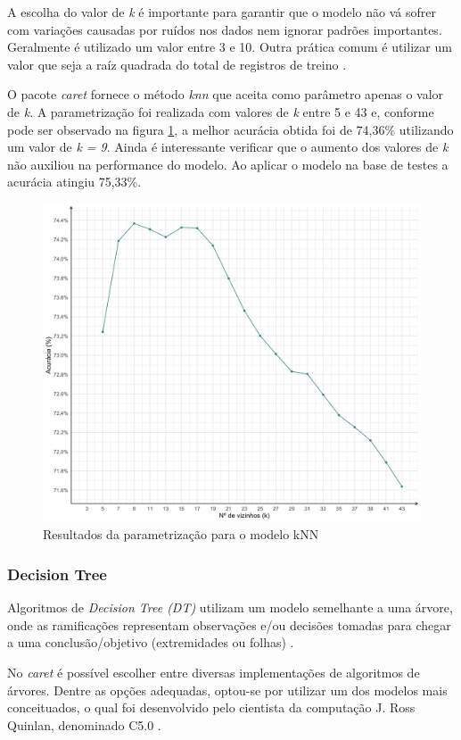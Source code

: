 \documentclass[12pt]{article}
\begin{document}
A escolha do valor de \textit{k} é importante para garantir que o modelo não vá sofrer com variações causadas por ruídos nos dados nem ignorar padrões importantes. Geralmente é utilizado um valor entre 3 e 10. Outra prática comum é utilizar um valor que seja a raíz quadrada do total de registros de treino \cite{lantz:mlinR, bonaccorso:mla}.

O pacote \textit{caret} fornece o método \textit{knn} que aceita como parâmetro apenas o valor de \textit{k}. A parametrização foi realizada com valores de \textit{k} entre 5 e 43 e, conforme pode ser observado na figura \ref{fig:knn_resultados}, a melhor acurácia obtida foi de 74,36\% utilizando um valor de \textit{k = 9}. Ainda é interessante verificar que o aumento dos valores de \textit{k} não auxiliou na performance do modelo. Ao aplicar o modelo na base de testes a acurácia atingiu 75,33\%.

\begin{figure}[ht]
\centering
\includegraphics[width=.8\textwidth]{knn_resultados.png}
\caption{Resultados da parametrização para o modelo kNN}
\label{fig:knn_resultados}
\end{figure}

\subsubsection{Decision Tree}

Algoritmos de \textit{Decision Tree (DT)} utilizam um modelo semelhante a uma árvore, onde as ramificações representam observações e/ou decisões tomadas para chegar a uma conclusão/objetivo (extremidades ou folhas) \cite{lantz:mlinR, aggarwal:dcaa}.

No \textit{caret} é possível escolher entre diversas implementações de algoritmos de árvores. Dentre as opções adequadas, optou-se por utilizar um dos modelos mais conceituados, o qual foi desenvolvido pelo cientista da computação J. Ross Quinlan, denominado C5.0 \cite{lantz:mlinR, caret:r}.
\end{document}
